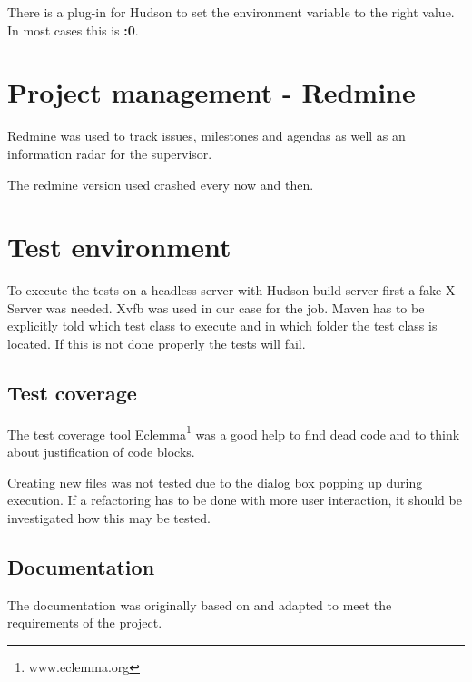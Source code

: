 There is a plug-in for Hudson to set the environment variable to
the right value. In most cases this is \textbf{:0}.

\section{Project management - Redmine}

Redmine was used to track issues, milestones and agendas as well as an 
information radar for the supervisor.

The redmine version used crashed every now and then. 

\section{Test environment}

To execute the tests on a headless server with Hudson build server first a fake
X Server was needed. Xvfb was used in our case for the job. Maven has to be
explicitly told which test class to execute and in which folder the test class
is located. If this is not done properly the tests will fail.

\subsection{Test coverage}

The test coverage tool Eclemma\footnote{www.eclemma.org} was a good help to find dead code and to think 
about justification of code blocks. 

Creating new files was not tested due to the dialog box popping up during 
execution. If a refactoring has to be done with more user interaction, it
should be investigated how this may be tested. 

\subsection{Documentation}

The documentation was originally based on \cite{AV08} and adapted to meet the 
requirements of the project.


